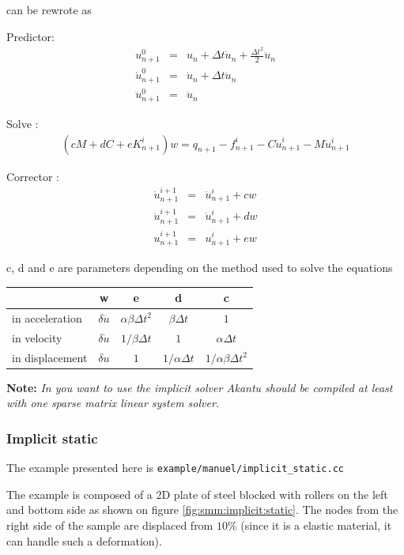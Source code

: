 \documentclass[a4paper,11pt]{book}
\newcommand{\code}[1]{{\tt{#1}}}
\newcommand{\note}[1]{\textbf{Note: }\textit{#1}}
\begin{document}
can be rewrote as

\noindent Predictor:
\begin{eqnarray}
  u^{0}_{n+1}        &=& u_{n} +  \Delta t \dot{u}_n + \frac{\Delta t^2}{2} \ddot{u}_n \\
  \dot{u}^{0}_{n+1}  &=& \dot{u}_{n} +  \Delta t \ddot{u}_{n} \\
  \ddot{u}^{0}_{n+1} &=& \ddot{u}_{n}
\end{eqnarray}

\noindent Solve :
\begin{eqnarray}
 (c M + d C + e K^i_{n+1}) w = q_{n+1} - f^i_{n+1} - C \dot{u}^i_{n+1} - M \ddot{u}^i_{n+1}
\end{eqnarray}

\noindent Corrector :
\begin{eqnarray}
  \ddot{u}^{i+1}_{n+1} &=& \ddot{u}^{i}_{n+1} + c w \\
  \dot{u}^{i+1}_{n+1} &=& \dot{u}^{i}_{n+1} + d w \\
  u^{i+1}_{n+1} &=& u^{i}_{n+1} + e w
\end{eqnarray}

c, d and e are parameters depending on the method used to solve the equations

\begin{center}
  \begin{tabular}{l|c|c|c|c}
    & w & e & d & c\\
    \hline
    in acceleration &$ \delta \ddot{u}$ & $\alpha \beta \Delta t^2$ &$\beta \Delta t$ &$1$\\
    in velocity & $ \delta \dot{u}$& $1/\beta \Delta t$ & $1$ & $\alpha \Delta t$\\
    in displacement &$\delta u$ & $ 1$ & $1/\alpha \Delta t$ & $1/\alpha \beta \Delta t^2$
  \end{tabular}
\end{center}

\note{In you want to use the  implicit solver Akantu should be compiled at least
  with one sparse matrix linear system solver.}

\subsubsection{Implicit static\label{sect:smm:implicit:static}}
The example presented here is \code{example/manuel/implicit\_static.cc}

The example is composed of a 2D  plate of steel blocked with rollers on the left
and bottom side as shown on figure \ref{fig:smm:implicit:static}. The nodes from
the right side  of the sample are  displaced from $10\%$ (since it  is a elastic
material, it can handle such a deformation).
\end{document}
